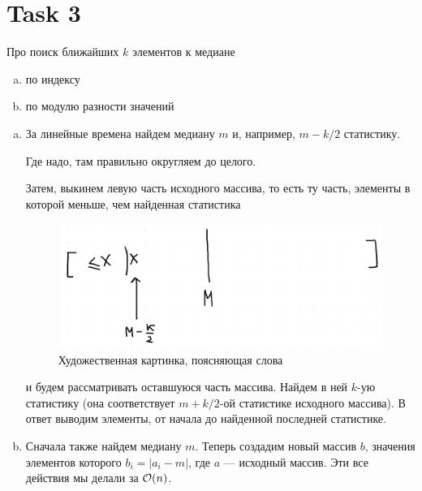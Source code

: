 \section{Task 3}
\begin{task}
    Про поиск ближайших $k$ элементов к медиане
    \begin{enumerate}[(a)]
        \item по индексу
        \item по модулю разности значений
    \end{enumerate}
\end{task}

\begin{solution}
    \begin{enumerate}[(a)]
        \item
        За линейные времена найдем медиану $m$ и, например, $m-k/2$ статистику.
        \begin{remark}
            Где надо, там правильно округляем до целого.
        \end{remark}
        Затем, выкинем левую часть исходного массива, то есть ту часть, элементы в которой меньше, чем найденная статистика
        \begin{figure}[H]
            \centering
            \includegraphics[scale=0.3]{pics/3_1.png}
            \caption{Художественная картинка, поясняющая слова}
        \end{figure}
        и будем рассматривать оставшуюся часть массива. Найдем в ней $k$-ую статистику (она соответствует $m+k/2$-ой статистике исходного массива). В ответ выводим элементы, от начала до найденной последней статистике.
        \item
        Сначала также найдем медиану $m$. Теперь создадим новый массив $b$, значения элементов которого $b_i = |a_i - m|$, где $a$ --- исходный массив. Эти все действия мы делали за $\mathcal{O}(n)$.
        

\end{enumerate}
\end{solution}
